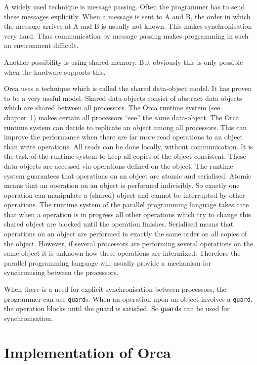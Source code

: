 \documentclass[a4paper,11pt]{article}
\begin{document}
A widely used technique is message passing. Often the programmer has
to send these messages explicitly. When a message is sent to A and B,
the order in which the message arrives at A and B is usually not known.
This makes synchronisation very hard. Thus communication by message
passing makes programming in such an environment difficult.

Another possibility is using shared memory. But obviously this is only
possible when the hardware supports this.

Orca uses a technique which is  called the shared data-object model.
It has proven to be a very useful model.
Shared data-objects consist of abstract data objects which are shared between
all processors. The Orca runtime system
(see chapter~\ref{sec:orca-implementation}) 
makes certain all processors ``see'' the same data-object.
The Orca runtime system
can decide to replicate an object among all processors. This can improve the
performance when there are far more read operations to an object than
write operations. All reads can be done locally, without communication.
It is the task of the runtime system
to keep all copies of the object consistent.
These data-objects
are accessed via operations defined on the object. The runtime system
guarantees
that operations on an object are atomic and serialised.
Atomic means that an operation
on an object is performed indivisibly. So exactly one operation can
manipulate a (shared) object and cannot be interrupted by other operations.
The runtime system of the parallel programming language takes care that
when a operation is in progress all other operations which try to change
this shared object are blocked until the operation finishes.
Serialised means that operations on an object are performed
in exactly the same order on all copies of the object.
However, if several processors are performing several operations on the
same object it is unknown how these operations are intermixed.
Therefore the parallel programming language will usually provide a mechanism
for synchronising between the processors.

When there is a need for explicit synchronisation between processors, the
programmer can use {\tt guard}s. When an
operation upon an object involves a {\tt guard}, the operation blocks
until the guard is satisfied. So {\tt guard}s can be used for synchronisation.

\section{Implementation of Orca}
\label{sec:orca-implementation}
\end{document}
